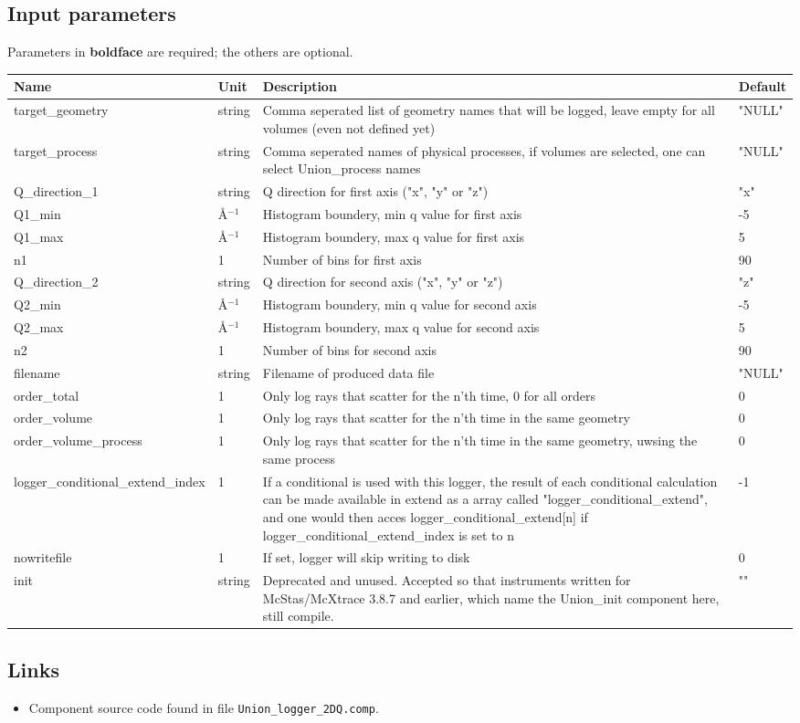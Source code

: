 \subsection*{Input parameters}
Parameters in \textbf{boldface} are required; the others are optional.

\begin{longtable}{p{}p{}p{}p{}}
\toprule
\textbf{Name} & \textbf{Unit} & \textbf{Description} & \textbf{Default} \\
\midrule
\endhead
target\_geometry & string & Comma seperated list of geometry names that will be logged, leave empty for all volumes (even not defined yet) & "NULL" \\
target\_process & string & Comma seperated names of physical processes, if volumes are selected, one can select Union\_process names & "NULL" \\
Q\_direction\_1 & string & Q direction for first axis ("x", "y" or "z") & "x" \\
Q1\_min & \AA{}$^{-1}$ & Histogram boundery, min q value for first axis & -5 \\
Q1\_max & \AA{}$^{-1}$ & Histogram boundery, max q value for first axis & 5 \\
n1 & 1 & Number of bins for first axis & 90 \\
Q\_direction\_2 & string & Q direction for second axis ("x", "y" or "z") & "z" \\
Q2\_min & \AA{}$^{-1}$ & Histogram boundery, min q value for second axis & -5 \\
Q2\_max & \AA{}$^{-1}$ & Histogram boundery, max q value for second axis & 5 \\
n2 & 1 & Number of bins for second axis & 90 \\
filename & string & Filename of produced data file & "NULL" \\
order\_total & 1 & Only log rays that scatter for the n'th time, 0 for all orders & 0 \\
order\_volume & 1 & Only log rays that scatter for the n'th time in the same geometry & 0 \\
order\_volume\_process & 1 & Only log rays that scatter for the n'th time in the same geometry, uwsing the same process & 0 \\
logger\_conditional\_extend\_index & 1 & If a conditional is used with this logger, the result of each conditional calculation can be made available in extend as a array called "logger\_conditional\_extend", and one would then acces logger\_conditional\_extend[n] if logger\_conditional\_extend\_index is set to n & -1 \\
nowritefile & 1 & If set, logger will skip writing to disk & 0 \\
init & string & Deprecated and unused. Accepted so that instruments written for McStas/McXtrace 3.8.7 and earlier, which name the Union\_init component here, still compile. & "" \\
\bottomrule
\end{longtable}

\subsection*{Links}
\begin{itemize}
  \item Component source code found in file \texttt{Union\_logger\_2DQ.comp}.
\end{itemize}
